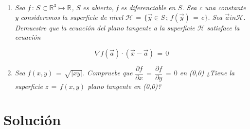 \documentclass[12pt]{article}
\newcommand{\solucion}{\section{Solución}}
\newcommand{\Rn}[1]{\mathbb{R}^{#1}}
\begin{document}
\begin{enumerate}
		\item \textit{Sea $f \, : \, S \subset \Rn{3} \mapsto \Rn{}$, $S$ es abierto, f es diferenciable en $S$. Sea c una constante y consideremos la superficie de nivel $\mathscr{H} \, = \, \{\vec{y} \in S \, ; \, f(\vec{y}) \, = \, c \}$. Sea $\vec{a} in \mathscr{H}$. Demuestre que la ecuación del plano tangente a la superficie $\mathscr{H}$ satisface la ecuación}
		
		$$ \nabla f (\vec{a}) \cdot (\vec{x} - \vec{a}) \, = \, 0 $$
		
		\item \textit{Sea $f(x,y) \, = \, \sqrt{| xy |}$. Compruebe que $\dfrac{\partial f}{\partial x} \, = \, \dfrac{\partial f}{\partial y} \, = \, 0$ en (0,0) ¿Tiene la superficie $z \, = \, f(x,y)$ plano tangente en (0,0)?}
		
	\end{enumerate}
	
	\pagebreak 
	
	\solucion
	
\end{document}
